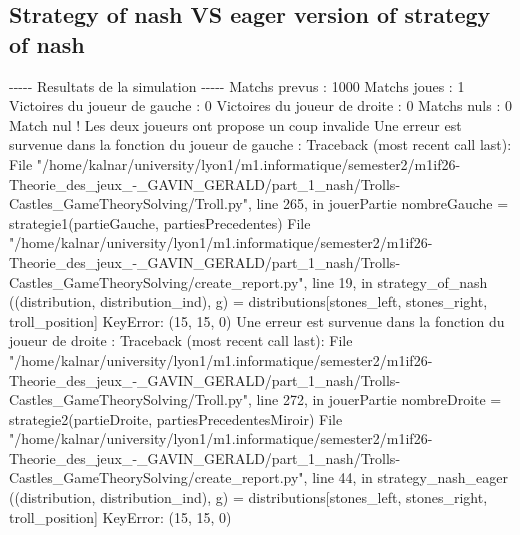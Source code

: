 \documentclass{article}%
\begin{document}
\subsection{Strategy of nash VS eager version of strategy of nash}%
\label{subsec:Strategy of nash VS eager version of strategy of nash}%
{-}{-}{-}{-}{-} Resultats de la simulation {-}{-}{-}{-}{-}\newline%
		\newline%
Matchs prevus : 1000\newline%
Matchs joues : 1\newline%
\newline%
Victoires du joueur de gauche : 0\newline%
Victoires du joueur de droite : 0\newline%
Matchs nuls : 0\newline%
\newline%
Match nul ! Les deux joueurs ont propose un coup invalide\newline%
Une erreur est survenue dans la fonction du joueur de gauche : \newline%
Traceback (most recent call last):\newline%
  File "/home/kalnar/university/lyon1/m1.informatique/semester2/m1if26{-}Theorie\_des\_jeux\_{-}\_GAVIN\_GERALD/part\_1\_nash/Trolls{-}Castles\_GameTheorySolving/Troll.py", line 265, in jouerPartie\newline%
    nombreGauche = strategie1(partieGauche, partiesPrecedentes)\newline%
  File "/home/kalnar/university/lyon1/m1.informatique/semester2/m1if26{-}Theorie\_des\_jeux\_{-}\_GAVIN\_GERALD/part\_1\_nash/Trolls{-}Castles\_GameTheorySolving/create\_report.py", line 19, in strategy\_of\_nash\newline%
    ((distribution, distribution\_ind), g) = distributions{[}stones\_left, stones\_right, troll\_position{]}\newline%
KeyError: (15, 15, 0)\newline%
\newline%
Une erreur est survenue dans la fonction du joueur de droite : \newline%
Traceback (most recent call last):\newline%
  File "/home/kalnar/university/lyon1/m1.informatique/semester2/m1if26{-}Theorie\_des\_jeux\_{-}\_GAVIN\_GERALD/part\_1\_nash/Trolls{-}Castles\_GameTheorySolving/Troll.py", line 272, in jouerPartie\newline%
    nombreDroite = strategie2(partieDroite, partiesPrecedentesMiroir)\newline%
  File "/home/kalnar/university/lyon1/m1.informatique/semester2/m1if26{-}Theorie\_des\_jeux\_{-}\_GAVIN\_GERALD/part\_1\_nash/Trolls{-}Castles\_GameTheorySolving/create\_report.py", line 44, in strategy\_nash\_eager\newline%
    ((distribution, distribution\_ind), g) = distributions{[}stones\_left, stones\_right, troll\_position{]}\newline%
KeyError: (15, 15, 0)\newline%
\end{document}
